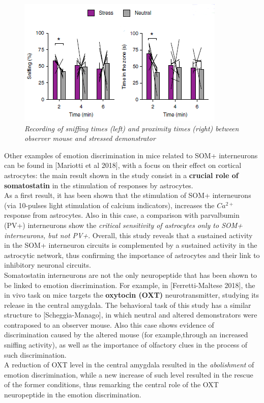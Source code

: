 \documentclass[a4paper]{article}
\begin{document}
	\begin{figure}
	\begin{center}
		\includegraphics[scale=.99]{scheggia.png} 
	\end{center} 
	\caption{\textit{Recording of sniffing times (left) and proximity times (right) between observer mouse and stressed demonstrator}}
	
\end{figure}


Other examples of emotion discrimination in mice related to SOM+ interneurons can be found in [Mariotti et al 2018], with a focus on their effect on cortical astrocytes: the main result shown in the study consist in a \textbf{crucial role of somatostatin} in the stimulation of responses by astrocytes.\\
As a first result, it has been shown that the stimulation of SOM+ interneurons (via 10-pulses light stimulation of calcium indicators), increases the $Ca^{2+}$ response from astrocytes. Also in this case, a comparison with parvalbumin (PV+) interneurons show the \textit{critical sensitivity of astrocytes only to SOM+ interneurons, but not PV+}. Overall, this study reveals that a sustained activity in the SOM+ interneuron circuits is complemented by
a sustained activity in the astrocytic network, thus confirming the importance of astrocytes and their link to inhibitory neuronal circuits. 
\\

Somatostatin interneurons are not the only neuropeptide that has been shown to be linked to emotion discrimination. For example, in [Ferretti-Maltese 2018], the in vivo task on mice targets the \textbf{oxytocin (OXT)} neurotransmitter, studying its release in the central amygdala. The behavioral task of this study has a similar structure to [Scheggia-Manago], in which neutral and altered demonstrators were contraposed to an observer mouse. Also this case shows evidence of  discrimination caused by the altered mouse (for example,through an increased sniffing activity), as well as the importance of olfactory clues in the process of such discrimination.\\
A reduction of  OXT level in the central amygdala resulted in the \textit{abolishment} of emotion discrimination, while a new increase of such level resulted in the rescue of the former conditions, thus remarking the central role of the OXT neuropeptide in the emotion discrimination.
\\
\end{document}
